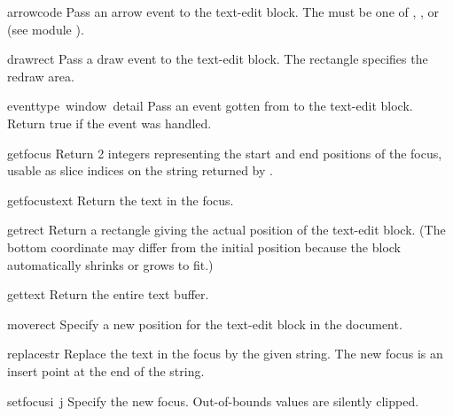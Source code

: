 \renewcommand{\indexsubitem}{(text-edit method)}

\begin{funcdesc}{arrow}{code}
Pass an arrow event to the text-edit block.
The
must be one of
,
,
or
(see module
).
\end{funcdesc}

\begin{funcdesc}{draw}{rect}
Pass a draw event to the text-edit block.
The rectangle specifies the redraw area.
\end{funcdesc}

\begin{funcdesc}{event}{type\, window\, detail}
Pass an event gotten from
to the text-edit block.
Return true if the event was handled.
\end{funcdesc}

\begin{funcdesc}{getfocus}{}
Return 2 integers representing the start and end positions of the
focus, usable as slice indices on the string returned by
.
\end{funcdesc}

\begin{funcdesc}{getfocustext}{}
Return the text in the focus.
\end{funcdesc}

\begin{funcdesc}{getrect}{}
Return a rectangle giving the actual position of the text-edit block.
(The bottom coordinate may differ from the initial position because
the block automatically shrinks or grows to fit.)
\end{funcdesc}

\begin{funcdesc}{gettext}{}
Return the entire text buffer.
\end{funcdesc}

\begin{funcdesc}{move}{rect}
Specify a new position for the text-edit block in the document.
\end{funcdesc}

\begin{funcdesc}{replace}{str}
Replace the text in the focus by the given string.
The new focus is an insert point at the end of the string.
\end{funcdesc}

\begin{funcdesc}{setfocus}{i\, j}
Specify the new focus.
Out-of-bounds values are silently clipped.
\end{funcdesc}

